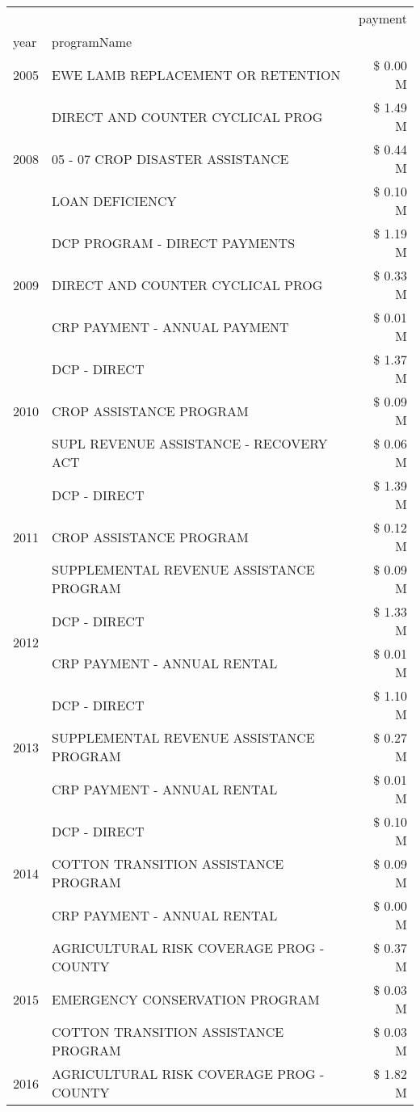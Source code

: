 \begin{tabular}{llr}
\toprule
 &  & payment \\
year & programName &  \\
\midrule
2005 & EWE LAMB REPLACEMENT OR RETENTION & \$ 0.00 M \\
\cline{1-3}
\multirow[t]{3}{*}{2008} & DIRECT AND COUNTER CYCLICAL PROG & \$ 1.49 M \\
 & 05 - 07 CROP DISASTER ASSISTANCE & \$ 0.44 M \\
 & LOAN DEFICIENCY & \$ 0.10 M \\
\cline{1-3}
\multirow[t]{3}{*}{2009} & DCP PROGRAM - DIRECT PAYMENTS & \$ 1.19 M \\
 & DIRECT AND COUNTER CYCLICAL PROG & \$ 0.33 M \\
 & CRP PAYMENT - ANNUAL PAYMENT & \$ 0.01 M \\
\cline{1-3}
\multirow[t]{3}{*}{2010} & DCP - DIRECT & \$ 1.37 M \\
 & CROP ASSISTANCE PROGRAM & \$ 0.09 M \\
 & SUPL REVENUE ASSISTANCE - RECOVERY ACT & \$ 0.06 M \\
\cline{1-3}
\multirow[t]{3}{*}{2011} & DCP - DIRECT & \$ 1.39 M \\
 & CROP ASSISTANCE PROGRAM & \$ 0.12 M \\
 & SUPPLEMENTAL REVENUE ASSISTANCE PROGRAM & \$ 0.09 M \\
\cline{1-3}
\multirow[t]{2}{*}{2012} & DCP - DIRECT & \$ 1.33 M \\
 & CRP PAYMENT - ANNUAL RENTAL & \$ 0.01 M \\
\cline{1-3}
\multirow[t]{3}{*}{2013} & DCP - DIRECT & \$ 1.10 M \\
 & SUPPLEMENTAL REVENUE ASSISTANCE PROGRAM & \$ 0.27 M \\
 & CRP PAYMENT - ANNUAL RENTAL & \$ 0.01 M \\
\cline{1-3}
\multirow[t]{3}{*}{2014} & DCP - DIRECT & \$ 0.10 M \\
 & COTTON TRANSITION ASSISTANCE PROGRAM & \$ 0.09 M \\
 & CRP PAYMENT - ANNUAL RENTAL & \$ 0.00 M \\
\cline{1-3}
\multirow[t]{3}{*}{2015} & AGRICULTURAL RISK COVERAGE PROG - COUNTY & \$ 0.37 M \\
 & EMERGENCY CONSERVATION PROGRAM & \$ 0.03 M \\
 & COTTON TRANSITION ASSISTANCE PROGRAM & \$ 0.03 M \\
\cline{1-3}
\multirow[t]{3}{*}{2016} & AGRICULTURAL RISK COVERAGE PROG - COUNTY & \$ 1.82 M \\

\end{tabular}
